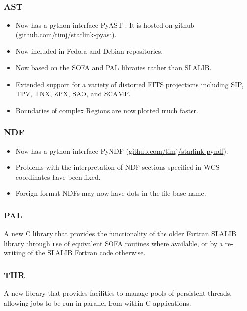 \subsubsection{AST}
\begin{itemize}
\item Now has a python interface-PyAST \citep{P011_adassxxi}. It is hosted on github (\url{github.com/timj/starlink-pyast}).
\item Now included in Fedora and Debian repositories.
\item Now based on the SOFA and PAL libraries rather than SLALIB.
\item Extended support for a variety of distorted FITS projections including SIP, TPV, TNX, ZPX, SAO, and SCAMP.
\item Boundaries of complex Regions are now plotted much faster.
\end{itemize}

\subsubsection{NDF}
\begin{itemize}
\item Now has a python interface-PyNDF (\url{github.com/timj/starlink-pyndf}).
\item Problems with the interpretation of NDF sections specified in WCS coordinates have been fixed.
\item Foreign format NDFs may now have dots in the file base-name.
\end{itemize}

\subsubsection{PAL}
A new C library that provides the functionality of the older Fortran SLALIB library through use of equivalent SOFA routines where available, or by a re-writing of the SLALIB Fortran code otherwise.

\subsubsection{THR}
A new library that provides facilities to manage pools of persistent threads, allowing jobs to be run in parallel from within C applications.

